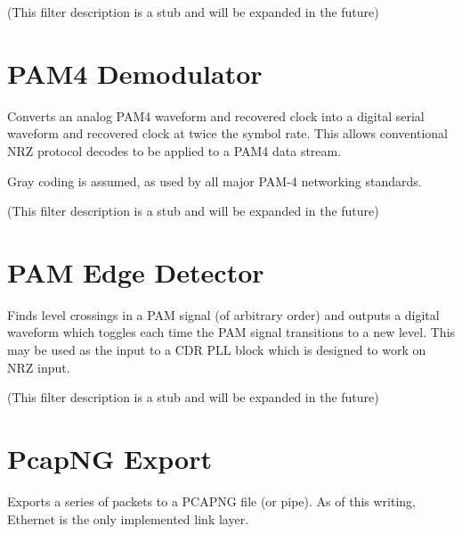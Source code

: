 (This filter description is a stub and will be expanded in the future)

\pagebreak
\section{PAM4 Demodulator}

Converts an analog PAM4 waveform and recovered clock into a digital serial waveform and recovered clock at twice the
symbol rate. This allows conventional NRZ protocol decodes to be applied to a PAM4 data stream.

Gray coding is assumed, as used by all major PAM-4 networking standards.

(This filter description is a stub and will be expanded in the future)

\pagebreak
\section{PAM Edge Detector}
\label{filter:pamedge}

Finds level crossings in a PAM signal (of arbitrary order) and outputs a digital waveform which toggles each time the
PAM signal transitions to a new level. This may be used as the input to a CDR PLL block which is designed to work on
NRZ input.

(This filter description is a stub and will be expanded in the future)


\pagebreak
\section{PcapNG Export}

Exports a series of packets to a PCAPNG file (or pipe). As of this writing, Ethernet is the only implemented link layer.

